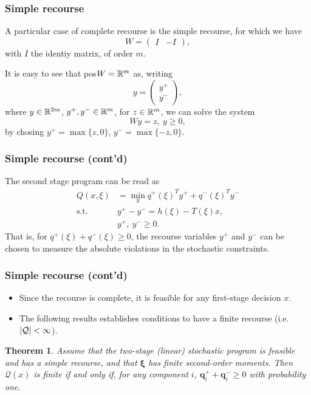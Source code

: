 \documentclass{beamer}
\newtheorem{theo}{Theorem}
\def\bxi{\boldsymbol\xi}
\def\bxi{\boldsymbol\xi}
\begin{document}
\begin{frame}
\frametitle{Simple recourse}

A particular case of complete recourse is the {\red simple recourse}, for which we have
\[
W = \begin{pmatrix} I & -I \end{pmatrix},
\]
with $I$ the identiy matrix, of order $m$.

\mbox{}

It is easy to see that pos$W = {\mathbb{R}}^m$ as, writing
$$
y = \begin{pmatrix}
	y^+ \\ y^-
\end{pmatrix},
$$
where $y \in {\mathbb{R}}^{2m}$, $y^+, y^- \in {\mathbb{R}}^m$, for $z \in {\mathbb{R}}^m$, we can solve the system
$$
Wy = z,\ y \geq 0,
$$
by chosing $y^+ = \max\{z,0\}$,  $y^- = \max\{-z,0\}$.

\end{frame}

\begin{frame}
\frametitle{Simple recourse (cont'd)}

The second stage program can be read as
\begin{align*}
Q(x,\xi) & = \min_y q^+(\xi)^Ty^+ + q^-(\xi)^Ty^- \\
\mbox{s.t. } & y^+ - y^- = h(\xi)-T(\xi)x,\\
& y^+,\ y^- \geq 0.
\end{align*}
That is, for $q^+(\xi) + q^-(\xi) \geq 0$, the recourse variables $y^+$ and $y^-$ can be chosen to %
measure the absolute violations in the stochastic constraints.

\end{frame}

\begin{frame}
\frametitle{Simple recourse (cont'd)}

\begin{itemize}
	\item 
Since the recourse is complete, it is feasible for any first-stage decision $x$.
\item
The following results establishes conditions to have a finite recourse (i.e. $| {\mathcal{Q}} | < \infty$).
\end{itemize}

\begin{theo}
Assume that the two-stage (linear) stochastic program is feasible and has a simple recourse, and that $\bxi$ has finite second-order moments.
Then $\mathcal{Q}(x)$ is finite if and only if, for any component $i$, $\boldsymbol{q}_i^+ + \boldsymbol{q}_i^- \geq 0$ with probability one.
\end{theo}

\end{frame}
\end{document}
